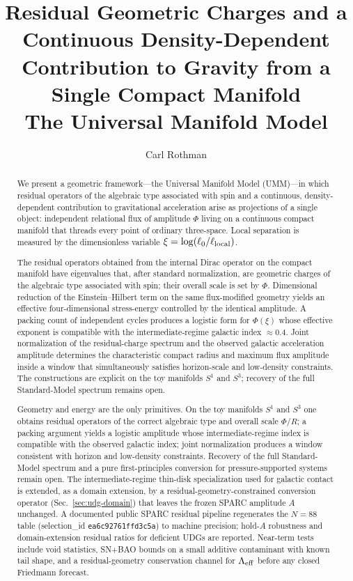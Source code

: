 \documentclass[11pt,a4paper]{article}
\title{Residual Geometric Charges and a Continuous Density-Dependent\\
Contribution to Gravity from a Single Compact Manifold\\[0.3em]
\large The Universal Manifold Model}
\author{Carl Rothman}
\date{}
\begin{document}
\maketitle

\begin{abstract}
We present a geometric framework---the Universal Manifold Model (UMM)---in which residual operators of the algebraic type associated with spin and a continuous, density-dependent contribution to gravitational acceleration arise as projections of a single object: independent relational flux of amplitude \(\Phi\) living on a continuous compact manifold that threads every point of ordinary three-space. Local separation is measured by the dimensionless variable \(\xi=\log(\ell_0/\ell_{\rm local})\).

The residual operators obtained from the internal Dirac operator on the compact manifold have eigenvalues that, after standard normalization, are geometric charges of the algebraic type associated with spin; their overall scale is set by \(\Phi\). Dimensional reduction of the Einstein--Hilbert term on the same flux-modified geometry yields an effective four-dimensional stress-energy controlled by the identical amplitude. A packing count of independent cycles produces a logistic form for \(\Phi(\xi)\) whose effective exponent is compatible with the intermediate-regime galactic index \(\approx0.4\). Joint normalization of the residual-charge spectrum and the observed galactic acceleration amplitude determines the characteristic compact radius and maximum flux amplitude inside a window that simultaneously satisfies horizon-scale and low-density constraints. The constructions are explicit on the toy manifolds \(S^1\) and \(S^3\); recovery of the full Standard-Model spectrum remains open.

Geometry and energy are the only primitives. On the toy manifolds \(S^1\) and \(S^3\) one obtains residual operators of the correct algebraic type and overall scale \(\Phi/R\); a packing argument yields a logistic amplitude whose intermediate-regime index is compatible with the observed galactic index; joint normalization produces a window consistent with horizon and low-density constraints. Recovery of the full Standard-Model spectrum and a pure first-principles conversion for pressure-supported systems remain open. The intermediate-regime thin-disk specialization used for galactic contact is extended, as a domain extension, by a residual-geometry-constrained conversion operator (Sec.~\ref{sec:udg-domain}) that leaves the frozen SPARC amplitude \(A\) unchanged. A documented public SPARC residual pipeline regenerates the \(N=88\) table (selection\_id \texttt{ea6c92761ffd3c5a}) to machine precision; hold-\(A\) robustness and domain-extension residual ratios for deficient UDGs are reported. Near-term tests include void statistics, SN+BAO bounds on a small additive contaminant with known tail shape, and a residual-geometry conservation channel for \(\Lambda_{\rm eff}\) before any closed Friedmann forecast.
\end{abstract}
\end{document}

